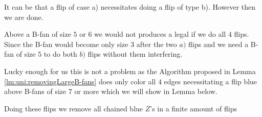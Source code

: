 It can be that a flip of case a) necessitates doing a flip of type b). However then we are done.

Above a B-fan of size $5$ or $6$ we would not produces a legal \rel if we do all $4$ flips. Since the B-fan would become only size $3$ after the two $a)$ flips and we need a B-fan of size $5$ to do both $b)$ flips without them interfering.

Lucky enough for us this is not a problem as the Algorithm proposed in Lemma \ref{lm:uni:removingLargeB-fans} does only color all $4$ edges necessitating a flip blue above B-fans of size $7$ or more which we will show in Lemma below.




\begin{lemma}
  \label{lm:uni:flips}
  Doing these flips we remove all chained blue $Z$'s in a finite amount of flips
\end{lemma}

